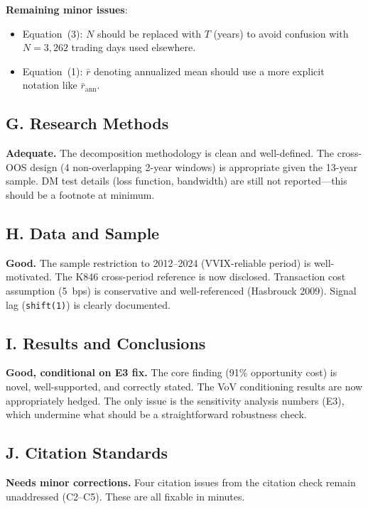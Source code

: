 \documentclass[12pt,a4paper]{article}
\begin{document}
\textbf{Remaining minor issues}:
\begin{itemize}[leftmargin=2em]
\item Equation~(3): $N$ should be replaced with $T$ (years) to avoid confusion with $N = 3{,}262$ trading days used elsewhere.
\item Equation~(1): $\bar{r}$ denoting annualized mean should use a more explicit notation like $\bar{r}_{\text{ann}}$.
\end{itemize}

\subsection*{G. Research Methods}

\textcolor{warncolor}{\textbf{Adequate.}} The decomposition methodology is clean and well-defined. The cross-OOS design (4 non-overlapping 2-year windows) is appropriate given the 13-year sample. DM test details (loss function, bandwidth) are still not reported---this should be a footnote at minimum.

\subsection*{H. Data and Sample}

\textcolor{okgreen}{\textbf{Good.}} The sample restriction to 2012--2024 (VVIX-reliable period) is well-motivated. The K846 cross-period reference is now disclosed. Transaction cost assumption (5~bps) is conservative and well-referenced (Hasbrouck 2009). Signal lag (\texttt{shift(1)}) is clearly documented.

\subsection*{I. Results and Conclusions}

\textcolor{okgreen}{\textbf{Good, conditional on E3 fix.}} The core finding (91\% opportunity cost) is novel, well-supported, and correctly stated. The VoV conditioning results are now appropriately hedged. The only issue is the sensitivity analysis numbers (E3), which undermine what should be a straightforward robustness check.

\subsection*{J. Citation Standards}

\textcolor{warncolor}{\textbf{Needs minor corrections.}} Four citation issues from the citation check remain unaddressed (C2--C5). These are all fixable in minutes.
\end{document}
